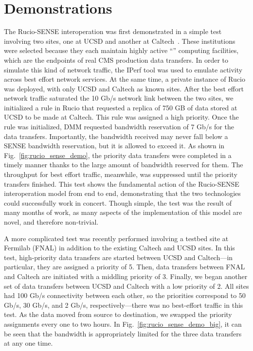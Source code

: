 \section{Demonstrations}
The Rucio-SENSE interoperation was first demonstrated in a simple test involving two sites, one at UCSD and another at Caltech~\cite{XLOOP}. 
These institutions were selected because they each maintain highly active ``'' computing facilities, which are the endpoints of real CMS production data transfers. 
In order to simulate this kind of network traffic, the IPerf tool was used to emulate activity across best effort network services. 
At the same time, a private instance of Rucio was deployed, with only UCSD and Caltech as known sites. 
After the best effort network traffic saturated the 10 Gb/s network link between the two sites, we initialized a rule in Rucio that requested a replica of 750 GB of data stored at UCSD to be made at Caltech. 
This rule was assigned a high priority. 
Once the rule was initialized, DMM requested bandwidth reservation of 7 Gb/s for the data transfers. 
Importantly, the bandwidth received may never fall below a SENSE bandwidth reservation, but it is allowed to exceed it. 
As shown in Fig.~\ref{fig:rucio_sense_demo}, the priority data transfers were completed in a timely manner thanks to the large amount of bandwidth reserved for them. 
The throughput for best effort traffic, meanwhile, was suppressed until the priority transfers finished. 
This test shows the fundamental action of the Rucio-SENSE interoperation model from end to end, demonstrating that the two technologies could successfully work in concert. 
Though simple, the test was the result of many months of work, as many aspects of the implementation of this model are novel, and therefore non-trivial. 

A more complicated test was recently performed involving a testbed site at Fermilab (FNAL) in addition to the existing Caltech and UCSD sites. 
In this test, high-priority data transfers are started between UCSD and Caltech---in particular, they are assigned a priority of 5. 
Then, data transfers between FNAL and Caltech are initiated with a middling priority of 3. 
Finally, we began another set of data transfers between UCSD and Caltech with a low priority of 2. 
All sites had 100 Gb/s connectivity between each other, so the priorities correspond to 50 Gb/s, 30 Gb/s, and 2 Gb/s, respectively---there was no best-effort traffic in this test. 
As the data moved from source to destination, we swapped the priority assignments every one to two hours. 
In Fig.~\ref{fig:rucio_sense_demo_big}, it can be seen that the bandwidth is appropriately limited for the three data transfers at any one time. 

